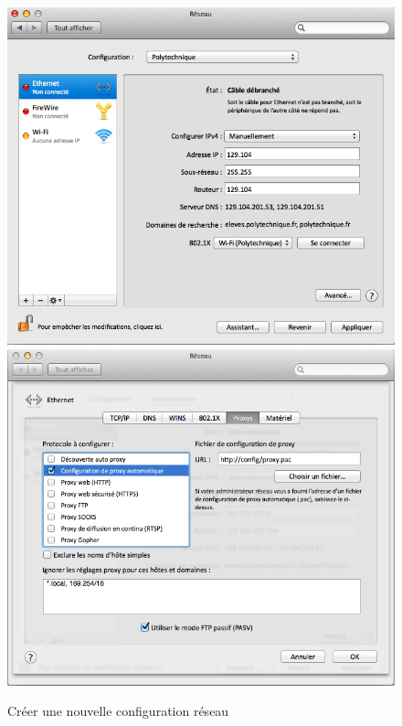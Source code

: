\begin{figure}[h]
\begin{center}
{\begin{minipage}{0.43 \textwidth}
\begin{flushright}
        {\includegraphics[width=0.96 \textwidth]{images/mac_config_ip_mountain_lion}} \\
        {\includegraphics[width=0.96 \textwidth]{images/mac_config_proxy_mountain_lion}}
        \end{flushright}
        \end{minipage}
            \label{config:mac:ip:mountain_lion}   }
        \caption{Cr\'eer une nouvelle configuration r\'eseau}

    \end{center}
  \end{figure}


